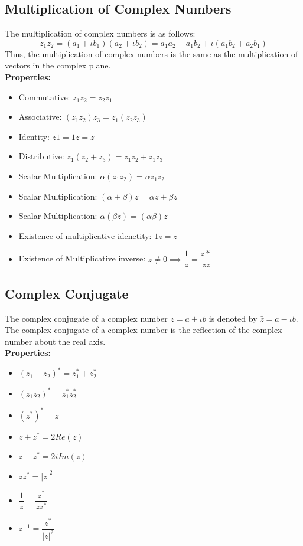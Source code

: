 \documentclass[12pt, oneside]{book}
\theoremstyle{definition}
\theoremstyle{definition}
\theoremstyle{remark}
\begin{document}
\subsection{Multiplication of Complex Numbers}
The multiplication of complex numbers is as follows:
\[ z_1z_2=(a_1+\iota b_1)(a_2+\iota b_2)=a_1a_2-a_1b_2+\iota(a_1b_2+a_2b_1) \]
Thus, the multiplication of complex numbers is the same as the multiplication of vectors in the complex plane.\\
\textbf{Properties: }
\begin{itemize}
    \item Commutative: $z_1z_2=z_2z_1$
    \item Associative: $(z_1z_2)z_3=z_1(z_2z_3)$
    \item Identity: $z1=1z=z$
    \item Distributive: $z_1(z_2+z_3)=z_1z_2+z_1z_3$
    \item Scalar Multiplication: $\alpha(z_1z_2)=\alpha z_1z_2$
    \item Scalar Multiplication: $(\alpha+\beta)z=\alpha z+\beta z$
    \item Scalar Multiplication: $\alpha(\beta z)=(\alpha \beta)z$
    \item Existence of multiplicative idenetity: $1z=z$
    \item Existence of Multiplicative inverse: $z\neq 0 \implies \dfrac{1}{z}=\dfrac{{z*}}{z\bar{z}}$
\end{itemize}

\subsection{Complex Conjugate}
The complex conjugate of a complex number $z=a+\iota b$ is denoted by $\bar{z}=a-\iota b$. The complex conjugate of a complex number is the reflection of the complex number about the real axis.\\
\textbf{Properties: }
\begin{itemize}
    \item ${(z_1+z_2)^*}=z_1^*+z_2^*$
    \item ${(z_1z_2)^*}=z_1^*z_2^*$
    \item ${(z^*)^*}=z$
    \item $z+z^*=2Re(z)$
    \item $z-z^*=2iIm(z)$
    \item $zz^*=|z|^2$
    \item $\dfrac{1}{z}=\dfrac{{z^*}}{zz^*}$
    \item $z^{-1}=\dfrac{{z^*}}{|z|^2}$
\end{itemize}
\end{document}
